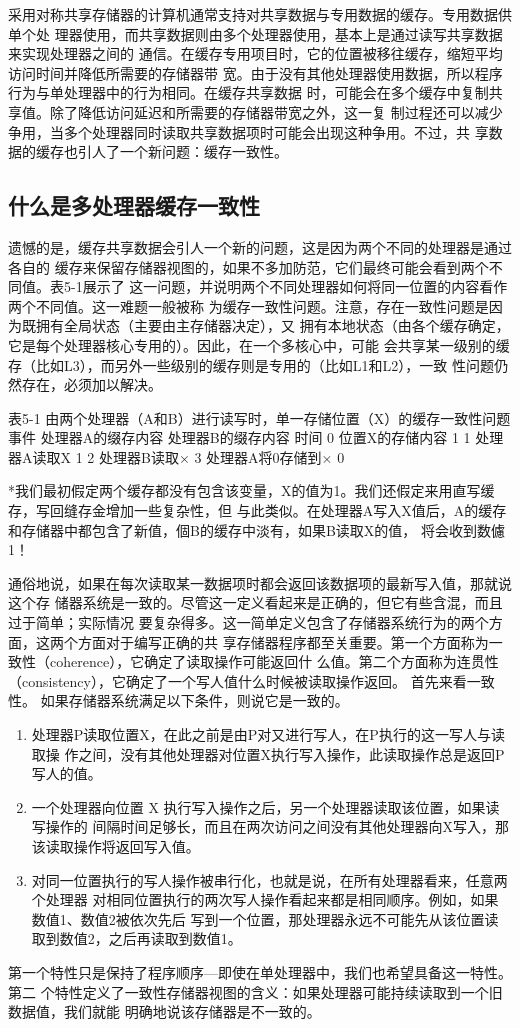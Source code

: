 采用对称共享存储器的计算机通常支持对共享数据与专用数据的缓存。专用数据供单个处
理器使用，而共享数据则由多个处理器使用，基本上是通过读写共享数据来实现处理器之间的
通信。在缓存专用项目时，它的位置被移往缓存，缩短平均访问时间并降低所需要的存储器带
宽。由于没有其他处理器使用数据，所以程序行为与单处理器中的行为相同。在缓存共享数据
时，可能会在多个缓存中复制共享值。除了降低访问延迟和所需要的存储器带宽之外，这一复
制过程还可以减少争用，当多个处理器同时读取共享数据项时可能会出现这种争用。不过，共
享数据的缓存也引人了一个新问题：缓存一致性。
\subsection{什么是多处理器缓存一致性}
遗憾的是，缓存共享数据会引人一个新的问题，这是因为两个不同的处理器是通过各自的
缓存来保留存储器视图的，如果不多加防范，它们最终可能会看到两个不同值。表5-1展示了
这一问题，并说明两个不同处理器如何将同一位置的内容看作两个不同值。这一难题一般被称
为缓存一致性问题。注意，存在一致性问题是因为既拥有全局状态（主要由主存储器决定），又
拥有本地状态（由各个缓存确定，它是每个处理器核心专用的）。因此，在一个多核心中，可能
会共享某一级别的缓存（比如L3），而另外一些级别的缓存则是专用的（比如L1和L2），一致
性问题仍然存在，必须加以解决。

表5-1 由两个处理器（A和B）进行读写时，单一存储位置（X）的缓存一致性问题
事件
处理器A的缀存内容
处理器B的缀存内容
时间
0
位置X的存储内容
1
1
处理器A读取X
1
2
处理器B读取×
3
处理器A将0存储到×
0

*我们最初假定两个缓存都没有包含该变量，X的值为1。我们还假定来用直写缓存，写回缝存金增加一些复杂性，但
与此类似。在处理器A写入X值后，A的缓存和存储器中都包含了新值，個B的缓存中淡有，如果B读取X的值，
将会收到数儢1！

通俗地说，如果在每次读取某一数据项时都会返回该数据项的最新写入值，那就说这个存
储器系统是一致的。尽管这一定义看起来是正确的，但它有些含混，而且过于简单；实际情况
要复杂得多。这一简单定义包含了存储器系统行为的两个方面，这两个方面对于编写正确的共
享存储器程序都至关重要。第一个方面称为一致性（coherence），它确定了读取操作可能返回什
么值。第二个方面称为连贯性（consistency），它确定了一个写人值什么时候被读取操作返回。
首先来看一致性。
如果存储器系统满足以下条件，则说它是一致的。

\begin{enumerate}
    \item 处理器P读取位置X，在此之前是由P对又进行写人，在P执行的这一写人与读取操
    作之间，没有其他处理器对位置X执行写入操作，此读取操作总是返回P写人的值。
    \item 一个处理器向位置 X 执行写入操作之后，另一个处理器读取该位置，如果读写操作的
    间隔时间足够长，而且在两次访问之间没有其他处理器向X写入，那该读取操作将返回写入值。
    \item 对同一位置执行的写人操作被串行化，也就是说，在所有处理器看来，任意两个处理器
    对相同位置执行的两次写人操作看起来都是相同顺序。例如，如果数值1、数值2被依次先后
    写到一个位置，那处理器永远不可能先从该位置读取到数值2，之后再读取到数值1。
\end{enumerate}
第一个特性只是保持了程序顺序—即使在单处理器中，我们也希望具备这一特性。第二
个特性定义了一致性存储器视图的含义：如果处理器可能持续读取到一个旧数据值，我们就能
明确地说该存储器是不一致的。

